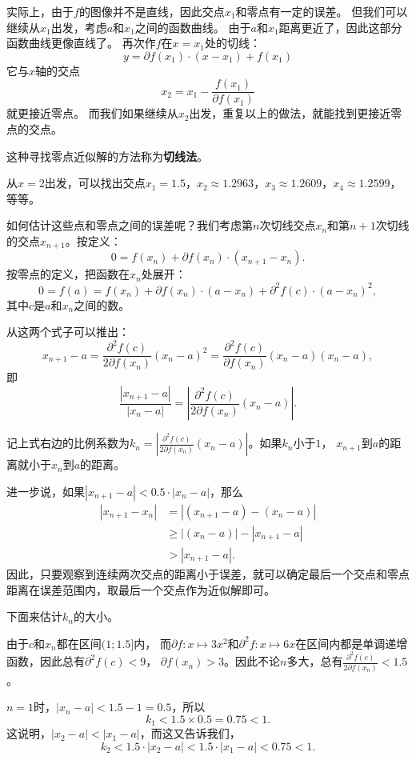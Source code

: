 \documentclass[12pt,UTF8]{ctexbook}
\begin{document}
实际上，由于$f$的图像并不是直线，因此交点$x_1$和零点有一定的误差。
但我们可以继续从$x_1$出发，考虑$a$和$x_1$之间的函数曲线。
由于$a$和$x_1$距离更近了，因此这部分函数曲线更像直线了。
再次作$f$在$x=x_1$处的切线：
$$ y = \partial f(x_1)\cdot (x - x_1) + f(x_1) $$
它与$x$轴的交点
$$ x_2 = x_1 - \frac{f(x_1)}{\partial f(x_1)} $$
就更接近零点。
而我们如果继续从$x_2$出发，重复以上的做法，就能找到更接近零点的交点。

这种寻找零点近似解的方法称为\textbf{切线法}。

从$x=2$出发，可以找出交点$x_1 = 1.5$，$x_2 \approx 1.2963$，$x_3 \approx 1.2609$，$x_4 \approx 1.2599$，等等。

如何估计这些点和零点之间的误差呢？我们考虑第$n$次切线交点$x_n$和第$n+1$次切线的交点$x_{n+1}$。按定义：
$$ 0 = f(x_n) + \partial f(x_n)\cdot (x_{n+1} - x_n). $$
按零点的定义，把函数在$x_n$处展开：
$$ 0 = f(a) = f(x_n) + \partial f(x_n)\cdot (a - x_n) + \partial^2 f(c)\cdot (a - x_n)^2, $$
其中$c$是$a$和$x_n$之间的数。

从这两个式子可以推出：
$$ x_{n+1} - a = \frac{\partial^2 f(c)}{2\partial f(x_n)} (x_n - a)^2 = \frac{\partial^2 f(c)}{\partial f(x_n)} (x_n - a)(x_n - a),$$
即
$$ \frac{\left| x_{n+1} - a \right|}{\left| x_n - a \right|} = \left| \frac{\partial^2 f(c)}{2\partial f(x_n)} (x_n - a)\right|.$$

记上式右边的比例系数为$k_n =  \left|\frac{\partial^2 f(c)}{2\partial f(x_n)} (x_n - a)\right|$。如果$k_n$小于$1$，
$x_{n+1}$到$a$的距离就小于$x_n$到$a$的距离。

进一步说，如果$\left| x_{n+1} - a \right| < 0.5 \cdot \left| x_n - a \right|$，那么
\begin{align*}
    \left| x_{n+1} - x_n \right| &= \left| (x_{n+1} - a) - (x_n - a) \right| \\
    &\geqslant  \left| (x_n - a) \right| - \left| x_{n+1} - a \right| \\
    &> \left| x_{n+1} - a \right|.
\end{align*}
因此，只要观察到连续两次交点的距离小于误差，就可以确定最后一个交点和零点距离在误差范围内，取最后一个交点作为近似解即可。

下面来估计$k_n$的大小。

由于$c$和$x_n$都在区间$(1;1.5]$内，
而$\partial f: x\mapsto 3x^2$和$\partial^2 f: x\mapsto 6x$在区间内都是单调递增函数，因此总有$\partial^2 f(c) < 9$，
$\partial f(x_n) > 3$。因此不论$n$多大，总有$\frac{\partial^2 f(c)}{2\partial f(x_n)} < 1.5$。

$n=1$时，$|x_n - a| < 1.5 - 1 = 0.5$，所以
$$k_1 < 1.5 \times 0.5 = 0.75 < 1.$$
这说明，$|x_2 - a| < |x_1 - a|$，而这又告诉我们，
$$k_2 < 1.5 \cdot |x_2 - a| < 1.5 \cdot |x_1 - a| <0.75 < 1.$$
\end{document}
